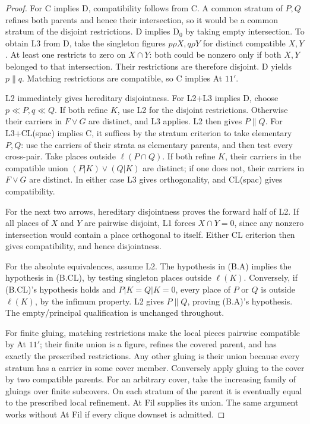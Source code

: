 \begin{proof}
For C implies D, compatibility follows from C. A common stratum of
\(P,Q\) refines both parents and hence their intersection, so it would
be a common stratum of the disjoint restrictions. D implies D\(_0\)
by taking empty intersection. To obtain L3 from D, take the singleton
figures \(p\rho X,q\rho Y\) for distinct compatible \(X,Y\).
At least one restricts to zero on \(X\cap Y\): both could be nonzero
only if both \(X,Y\) belonged to that intersection. Their restrictions
are therefore disjoint. D yields \(p\parallel q\). Matching
restrictions are compatible, so C implies At \(11'\).

L2 immediately gives hereditary disjointness. For L2+L3 implies D,
choose \(p\ll P,q\ll Q\). If both refine \(K\), use L2 for the
disjoint restrictions. Otherwise their carriers in \(F\vee G\) are
distinct, and L3 applies. L2 then gives \(P\parallel Q\).
For L3+CL(spac) implies C, it suffices by the stratum criterion
to take elementary \(P,Q\): use the carriers of their strata as
elementary parents, and then test every cross-pair. Take places outside
\(\ell(P\cap Q)\). If both refine \(K\), their carriers in the
compatible union \((P|K)\vee(Q|K)\) are distinct; if one does not,
their carriers in \(F\vee G\) are distinct. In either case L3 gives
orthogonality, and CL(spac) gives compatibility.

For the next two arrows, hereditary disjointness proves the forward
half of L2. If all places of \(X\) and \(Y\) are pairwise disjoint,
L1 forces \(X\cap Y=0\), since any nonzero intersection would contain
a place orthogonal to itself. Either CL criterion then gives
compatibility, and hence disjointness.

For the absolute equivalences, assume L2. The hypothesis in (B.A)
implies the hypothesis in (B.CL), by testing singleton places outside
\(\ell(K)\). Conversely, if (B.CL)'s hypothesis holds and
\(P|K=Q|K=0\), every place of \(P\) or \(Q\) is outside \(\ell(K)\),
by the infimum property. L2 gives \(P\parallel Q\), proving (B.A)'s
hypothesis. The empty/principal qualification is unchanged throughout.

For finite gluing, matching restrictions make the local pieces
pairwise compatible by At \(11'\); their finite union is a figure,
refines the covered parent, and has exactly the prescribed
restrictions. Any other gluing is their union because every stratum
has a carrier in some cover member. Conversely apply gluing to the
cover by two compatible parents. For an arbitrary cover, take the
increasing family of gluings over finite subcovers. On each stratum
of the parent it is eventually equal to the prescribed local
refinement. At Fil supplies its union. The same argument works
without At Fil if every clique downset is admitted.
\end{proof}

